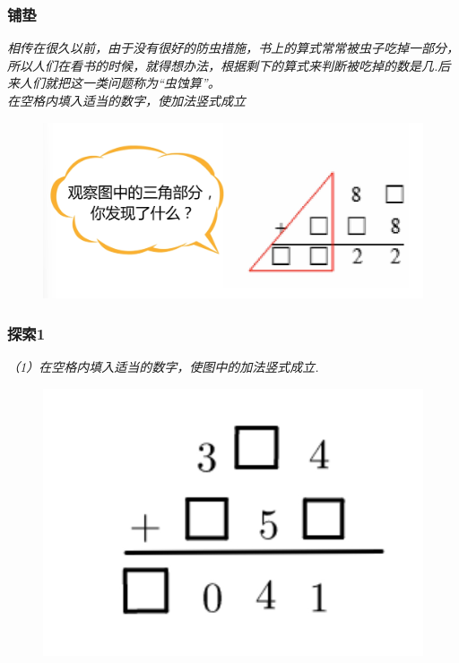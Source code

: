 \begin{frame}
    \frametitle{铺垫}
    \textit{相传在很久以前，由于没有很好的防虫措施，书上的算式常常被虫子吃掉一部分，所以人们在看书的时候，就得想办法，根据剩下的算式来判断被吃掉的数是几.后来人们就把这一类问题称为“虫蚀算”。\\
    在空格内填入适当的数字，使加法竖式成立}

    \begin{figure}[H] 
        \centering
        \includegraphics[width=1\textwidth]{./pics/Chapter_3/pudian.png}
    \end{figure}
\end{frame}

\begin{frame}
    \frametitle{探索1}
    \textit{（1）在空格内填入适当的数字，使图中的加法竖式成立.}

    \begin{figure}[H] 
        \centering
        \includegraphics[width=1\textwidth]{./pics/Chapter_3/tansuo1_1.png}
    \end{figure}
\end{frame}

